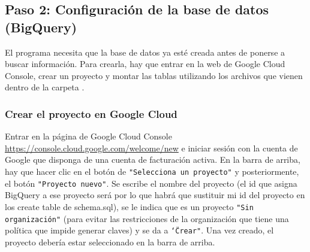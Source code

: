 \subsection{Paso 2: Configuración de la base de datos (BigQuery)}
El programa necesita que la base de datos ya esté creada antes de ponerse a buscar información. Para crearla, hay que entrar en la web de Google Cloud Console, crear un proyecto y montar las tablas utilizando los archivos que vienen dentro de la carpeta .

\subsubsection{Crear el proyecto en Google Cloud}
Entrar en la página de Google Cloud Console \url{https://console.cloud.google.com/welcome/new} e iniciar sesión con la cuenta de Google que disponga de una cuenta de facturación activa. En la barra de arriba, hay que hacer clic en el botón de \texttt{"Selecciona un proyecto"} y posteriormente, el botón \texttt{"Proyecto nuevo"}. Se escribe el nombre del proyecto (el id que asigna BigQuery a ese proyecto será por lo que habrá que sustituir mi id del proyecto en los create table de schema.sql), se le indica que es un proyecto \texttt{"Sin organización"} (para evitar las restricciones de la organización que tiene una política que impide generar claves) y se da a \texttt{\char`\"Crear"}. Una vez creado, el proyecto debería estar seleccionado en la barra de arriba.

